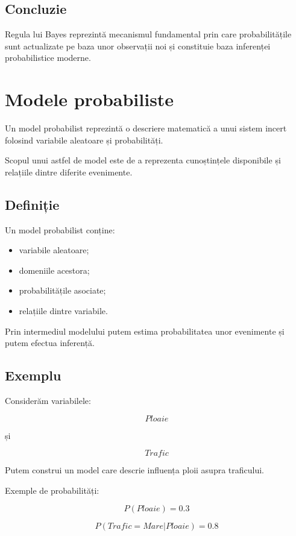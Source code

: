 \documentclass[12pt,a4paper]{article}
\begin{document}
\subsection{Concluzie}

Regula lui Bayes reprezintă mecanismul fundamental prin care probabilitățile sunt actualizate pe baza unor observații noi și constituie baza inferenței probabilistice moderne.



\section{Modele probabiliste}

Un model probabilist reprezintă o descriere matematică a unui sistem incert folosind variabile aleatoare și probabilități.

Scopul unui astfel de model este de a reprezenta cunoștințele disponibile și relațiile dintre diferite evenimente.

\subsection{Definiție}

Un model probabilist conține:

\begin{itemize}
\item variabile aleatoare;
\item domeniile acestora;
\item probabilitățile asociate;
\item relațiile dintre variabile.
\end{itemize}

Prin intermediul modelului putem estima probabilitatea unor evenimente și putem efectua inferență.

\subsection{Exemplu}

Considerăm variabilele:

\[
Ploaie
\]

și

\[
Trafic
\]

Putem construi un model care descrie influența ploii asupra traficului.

Exemple de probabilități:

\[
P(Ploaie)=0.3
\]

\[
P(Trafic=Mare|Ploaie)=0.8
\]
\end{document}
